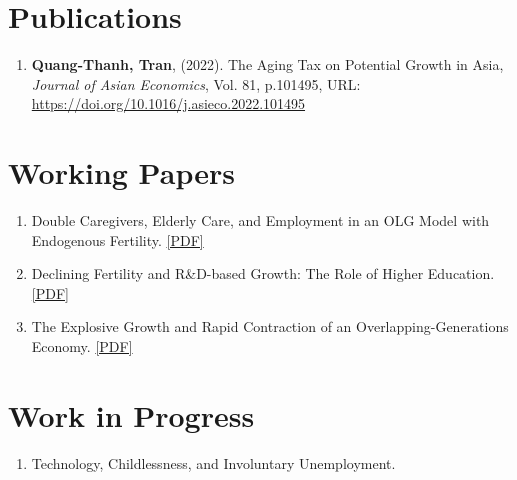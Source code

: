 \section{\sc Publications}
\begin{enumerate}
\item
  {\bf Quang-Thanh, Tran},
  (2022).
  {The Aging Tax on Potential Growth in Asia},
  {\it Journal of Asian Economics}, Vol. 81, p.101495,
  {URL: \url{https://doi.org/10.1016/j.asieco.2022.101495}}
\end{enumerate}

\section{\sc Working Papers}
\begin{enumerate}
  \item Double Caregivers, Elderly Care, and Employment in an OLG Model with Endogenous Fertility. \href{https://www.dropbox.com/scl/fi/xr9qr05jw0df2fhd4kzsd/QTTran_Elderly.pdf?rlkey=vte4fo80110uaaqci1b3pxlgz&st=lcptweom&dl=0}{[PDF]}
  \item Declining Fertility and R\&D-based Growth: The Role of Higher Education. \href{https://www.dropbox.com/scl/fi/51b1sug5wckaqk639zyj7/QTTran_DeclineFertility_RD.pdf?rlkey=z3oi7rjrfy5mgm96hc98mkjw5&st=ql5ewejf&dl=0}{[PDF]}
  \item The Explosive Growth and Rapid Contraction of an Overlapping-Generations Economy. \href{https://www.dropbox.com/scl/fi/c7w4scqzodthxsgzu8dn5/Kitagawa_Tran_contractionOLG.pdf?rlkey=r0hn2t7rv826im7uqszu58vft&st=9o4d7b4z&dl=0}{[PDF]}
\end{enumerate}

\section{\sc Work in Progress}
\begin{enumerate}
  \item Technology, Childlessness, and Involuntary Unemployment.
\end{enumerate}


